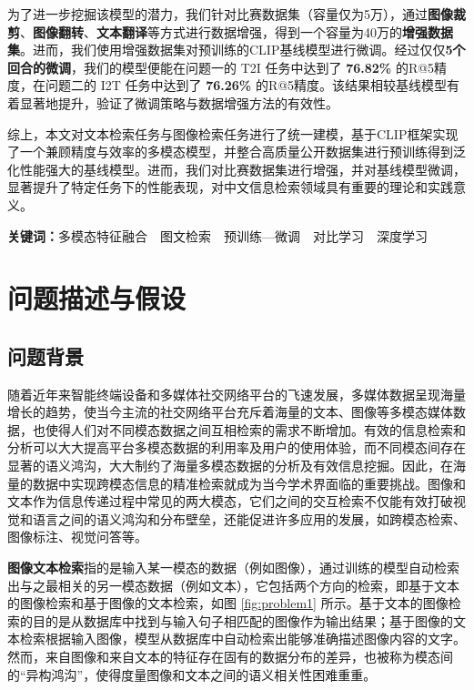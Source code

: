 \documentclass[a4paper]{zreport}
\begin{document}
为了进一步挖掘该模型的潜力，我们针对比赛数据集（容量仅为5万），通过\textbf{图像裁剪}、\textbf{图像翻转}、\textbf{文本翻译}等方式进行数据增强，得到一个容量为40万的\textbf{增强数据集}。进而，我们使用增强数据集对预训练的CLIP基线模型进行微调。经过仅仅\textbf{5个回合的微调}，我们的模型便能在问题一的 T2I 任务中达到了 \textbf{76.82\%} 的R@5精度，在问题二的 I2T 任务中达到了 \textbf{76.26\%} 的R@5精度。该结果相较基线模型有着显著地提升，验证了微调策略与数据增强方法的有效性。

综上，本文对文本检索任务与图像检索任务进行了统一建模，基于CLIP框架实现了一个兼顾精度与效率的多模态模型，并整合高质量公开数据集进行预训练得到泛化性能强大的基线模型。进而，我们对比赛数据集进行增强，并对基线模型微调，显著提升了特定任务下的性能表现，对中文信息检索领域具有重要的理论和实践意义。


\vspace{0.5em}

\textbf{关键词：}\medspace 多模态特征融合~~图文检索~~预训练—微调~~对比学习~~深度学习

\setcounter{page}{1}
\tableofcontents
\newpage

\setcounter{page}{1}

\linespread{1.5}

\section{问题描述与假设}

\subsection{问题背景}

随着近年来智能终端设备和多媒体社交网络平台的飞速发展，多媒体数据呈现海量增长的趋势，使当今主流的社交网络平台充斥着海量的文本、图像等多模态媒体数据，也使得人们对不同模态数据之间互相检索的需求不断增加。有效的信息检索和分析可以大大提高平台多模态数据的利用率及用户的使用体验，而不同模态间存在显著的语义鸿沟，大大制约了海量多模态数据的分析及有效信息挖掘。因此，在海量的数据中实现跨模态信息的精准检索就成为当今学术界面临的重要挑战。图像和文本作为信息传递过程中常见的两大模态，它们之间的交互检索不仅能有效打破视觉和语言之间的语义鸿沟和分布壁垒，还能促进许多应用的发展，如跨模态检索、图像标注、视觉问答等。

\textbf{图像文本检索}指的是输入某一模态的数据（例如图像），通过训练的模型自动检索出与之最相关的另一模态数据（例如文本），它包括两个方向的检索，即基于文本的图像检索和基于图像的文本检索，如图 \ref{fig:problem1} 所示。基于文本的图像检索的目的是从数据库中找到与输入句子相匹配的图像作为输出结果；基于图像的文本检索根据输入图像，模型从数据库中自动检索出能够准确描述图像内容的文字。然而，来自图像和来自文本的特征存在固有的数据分布的差异，也被称为模态间的“异构鸿沟”，使得度量图像和文本之间的语义相关性困难重重。
\end{document}
